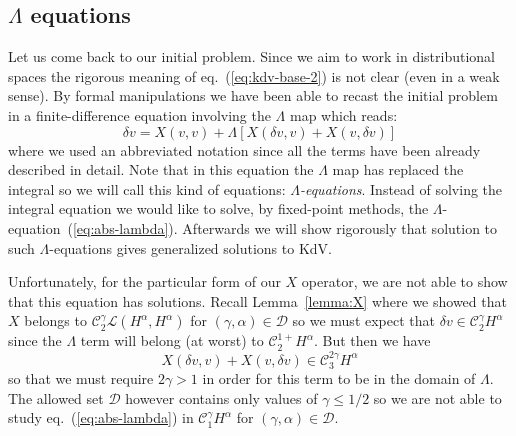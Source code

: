 \documentclass[a4paper,11pt,reqno]{article}
\newcommand{\der}{\delta}
\newcommand{\CC}{\mathcal{C}}
\newcommand{\DD}{\mathcal{D}}
\newcommand{\LL}{\mathcal{L}}
\begin{document}
\subsection{$\Lambda$ equations}

Let us come back to our initial problem. Since we aim to work in distributional spaces the rigorous meaning of eq.~(\ref{eq:kdv-base-2}) is not clear (even in a weak sense). By formal manipulations we have been able to recast the initial problem in a finite-difference equation involving the $\Lambda$ map which reads:
\begin{equation}
  \label{eq:abs-lambda}
\der v = X(v,v) + \Lambda[X(\der v, v) + X(v, \der v)]   
\end{equation}
where we used an abbreviated notation since all the terms have been
already described in detail. Note that in this equation the $\Lambda$ map has replaced the integral
 so we
will call this kind of equations: \emph{$\Lambda$-equations}. Instead
of solving the integral equation 
we would like to  solve, by fixed-point
methods, the $\Lambda$-equation~(\ref{eq:abs-lambda}). Afterwards we will show rigorously that solution to such $\Lambda$-equations gives generalized solutions to KdV.

\bigskip
  Unfortunately,
for the particular form of our $X$ operator, we are not able to show
that this equation has solutions. Recall  Lemma~\ref{lemma:X} where we showed that $X$ belongs to 
$\CC_2^\gamma \LL(H^\alpha,H^\alpha)$ for $(\gamma,\alpha) \in \DD$ so we
must expect that $\der v \in \CC_2^\gamma  H^\alpha$ since the
$\Lambda$ term will belong (at worst) to $\CC_2^{1+} H^\alpha$. But then we have
$$
X(\der v,v) + X(v,\der v) \in \CC_3^{2\gamma} H^\alpha
$$ 
so that we must require $2\gamma > 1$ in order for this term to be in
the domain of $\Lambda$. The allowed set $\DD$ however contains only
values of $\gamma \le 1/2$ so we are not able to study
eq.~(\ref{eq:abs-lambda}) in $\CC_1^\gamma H^\alpha$ for
$(\gamma,\alpha) \in \DD$.
\end{document}
